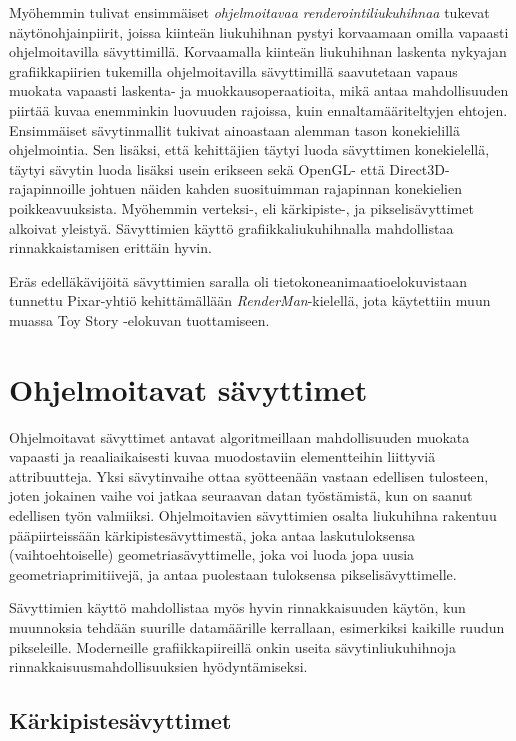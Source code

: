 \documentclass[finnish]{tktltiki2}
\theoremstyle{definition}
\theoremstyle{remark}
\begin{document}
Myöhemmin tulivat ensimmäiset \emph{ohjelmoitavaa renderointiliukuhihnaa} tukevat näytönohjainpiirit, joissa kiinteän liukuhihnan pystyi korvaamaan omilla vapaasti ohjelmoitavilla sävyttimillä. Korvaamalla kiinteän liukuhihnan laskenta nykyajan grafiikkapiirien tukemilla ohjelmoitavilla sävyttimillä saavutetaan vapaus muokata vapaasti laskenta- ja muokkausoperaatioita, mikä antaa mahdollisuuden piirtää kuvaa enemminkin luovuuden rajoissa, kuin ennaltamääriteltyjen ehtojen. Ensimmäiset sävytinmallit tukivat ainoastaan alemman tason konekielillä ohjelmointia. Sen lisäksi, että kehittäjien täytyi luoda sävyttimen konekielellä, täytyi sävytin luoda lisäksi usein erikseen sekä OpenGL- että Direct3D-rajapinnoille johtuen näiden kahden suosituimman rajapinnan konekielien poikkeavuuksista. Myöhemmin verteksi-, eli kärkipiste-, ja pikselisävyttimet alkoivat yleistyä. Sävyttimien käyttö grafiikkaliukuhihnalla mahdollistaa rinnakkaistamisen erittäin hyvin. 
\cite{Ake02}

Eräs edelläkävijöitä sävyttimien saralla oli tietokoneanimaatioelokuvistaan tunnettu Pixar-yhtiö kehittämällään \emph{RenderMan}-kielellä, jota käytettiin muun muassa Toy Story -elokuvan tuottamiseen.

\section{Ohjelmoitavat sävyttimet}

Ohjelmoitavat sävyttimet antavat algoritmeillaan mahdollisuuden muokata vapaasti ja reaaliaikaisesti kuvaa muodostaviin elementteihin liittyviä attribuutteja. Yksi sävytinvaihe ottaa syötteenään vastaan edellisen tulosteen, joten jokainen vaihe voi jatkaa seuraavan datan työstämistä, kun on saanut edellisen työn valmiiksi. Ohjelmoitavien sävyttimien osalta liukuhihna rakentuu pääpiirteissään kärkipistesävyttimestä, joka antaa laskutuloksensa (vaihtoehtoiselle) geometriasävyttimelle, joka voi luoda jopa uusia geometriaprimitiivejä, ja antaa puolestaan tuloksensa pikselisävyttimelle.

Sävyttimien käyttö mahdollistaa myös hyvin rinnakkaisuuden käytön, kun muunnoksia tehdään suurille datamäärille kerrallaan, esimerkiksi kaikille ruudun pikseleille. Moderneille grafiikkapiireillä onkin useita sävytinliukuhihnoja rinnakkaisuusmahdollisuuksien hyödyntämiseksi.



\subsection{Kärkipistesävyttimet}
\end{document}
